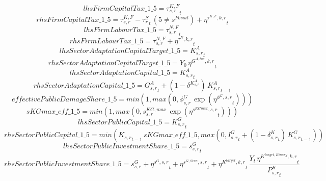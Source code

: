 \begin{dmath*}
lhsFirmCapitalTax\_1\_5 = {{\tau^{K,F}_{s,r}}}_{t}
\end{dmath*}
\begin{dmath*}
rhsFirmCapitalTax\_1\_5 = {{\tau^{K,F}_{s,r}}}-{{\tau^{S}_{r}}}_{t}\, \left(5\neq {{s^{Fossil}}}\right)+{{\eta^{\tau^{K,F},k,r}}}_{t}
\end{dmath*}
\begin{dmath*}
lhsFirmLabourTax\_1\_5 = {{\tau^{N,F}_{s,r}}}_{t}
\end{dmath*}
\begin{dmath*}
rhsFirmLabourTax\_1\_5 = {{\tau^{N,F}_{s,r}}}+{{\eta^{\tau^{N},k,r}}}_{t}
\end{dmath*}
\begin{dmath*}
lhsSectorAdaptationCapitalTarget\_1\_5 = {{K^{A}_{s,r}}}_{t}
\end{dmath*}
\begin{dmath*}
rhsSectorAdaptationCapitalTarget\_1\_5 = {{Y_0}}\, {{\eta^{G^{A,tas},k,r}}}_{t}
\end{dmath*}
\begin{dmath*}
lhsSectorAdaptationCapital\_1\_5 = {{K^{A}_{s,r}}}_{t}
\end{dmath*}
\begin{dmath*}
rhsSectorAdaptationCapital\_1\_5 = {{G^{A}_{s,r}}}_{t}+\left(1-{{\delta^{K^{A}_{s,r}}}}\right)\, {{K^{A}_{s,r}}}_{t-1}
\end{dmath*}
\begin{dmath*}
effectivePublicDamageShare\_1\_5 = min(1,max(0,{{\phi^{G}_{s,r}}}\, \exp\left({{\eta^{\phi^{G},s,r}}}_{t}\right)))
\end{dmath*}
\begin{dmath*}
sKGmax\_eff\_1\_5 = min(1,max(0,{{s^{KG,max}_{s,r}}}\, \exp\left({{\eta^{s^{KGmax},s,r}}}_{t}\right)))
\end{dmath*}
\begin{dmath*}
lhsSectorPublicCapital\_1\_5 = {{K^G_{s,r}}}_{t}
\end{dmath*}
\begin{dmath*}
rhsSectorPublicCapital\_1\_5 = min({{K_{s,r}}}_{t-1}\, {sKGmax\_eff\_1\_5},max(0,{{I^G_{s,r}}}_{t}+\left(1-{{\delta^{K}_{s,r}}}_{t}\right)\, {{K^G_{s,r}}}_{t-1}))
\end{dmath*}
\begin{dmath*}
lhsSectorPublicInvestmentShare\_1\_5 = {{s^G_{s,r}}}_{t}
\end{dmath*}
\begin{dmath*}
rhsSectorPublicInvestmentShare\_1\_5 = {{s^{G}_{s,r}}}+{{\eta^{s^G,s,r}}}_{t}+{{\eta^{s^{G,Scen},s,r}}}_{t}+{{\eta^{K^{target},k,r}}}_{t}\, \frac{{Y}_{t}\, {{\eta^{K^{target,Binary},k,r}}}_{t}}{{{P^K_{s,r}}}_{t}}
\end{dmath*}
